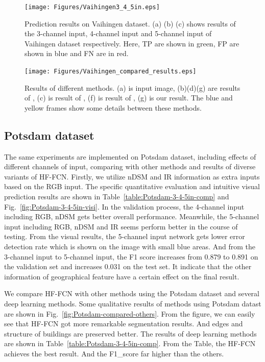 \begin{figure}
\vspace{-0.2cm}
\setlength{\abovecaptionskip}{-0cm}
\setlength{\belowcaptionskip}{-1cm}  
\centering
\texttt{[image: Figures/Vaihingen3\_4\_5in.eps]}
\caption{Prediction results on Vaihingen dataset. (a) (b) (c) shows results of the 3-channel input, 4-channel input and 5-channel input of Vaihingen dataset respectively. Here, TP are shown in green, FP are shown in blue and FN are in red.}
\label{fig:Vaihingen-3-4-5in}
\end{figure}

\begin{figure}
\vspace{-0.2cm}
\setlength{\abovecaptionskip}{-0cm}
\setlength{\belowcaptionskip}{-2cm}  
\centering
\texttt{[image: Figures/Vaihingen\_compared\_results.eps]}
\caption{Results of different methods. (a) is input image, (b)(d)(g) are results of \cite{IEEEexample:audebert2017deep}, (c) is result of \cite{IEEEexample:marmanis2016semantic}, (f) is result of \cite{IEEEexample:unknown}, (g) is our result. The blue and yellow frames show some details between these methods.}
\label{fig:Vaihingen-compared-others}
\end{figure}

\subsection{Potsdam dataset}
 The same experiments are implemented on Potsdam dataset, including effects of different channels of input, comparing with other methods and results of diverse variants of HF-FCN. Firstly, we utilize nDSM and IR information as extra inputs based on the RGB input. The specific quantitative evaluation and intuitive visual prediction results are shown in Table~\ref{table:Potsdam-3-4-5in-comp} and Fig.~\ref{fig:Potsdam-3-4-5in-visi}. In the validation process, the 4-channel input including RGB, nDSM gets better overall performance. Meanwhile, the 5-channel input including RGB, nDSM and IR seems perform better in the course of testing. From the visual results, the 5-channel input network gets lower error detection rate which is shown on the image with small blue areas. And from the 3-channel input to 5-channel input, the F1 score increases from 0.879 to 0.891 on the validation set and increases 0.031 on the test set. It indicate that the other information of geographical feature have a certain effect on the final result.

 We compare HF-FCN with other methods using the Potsdam dataset and several deep learning methods. Some qualitative results of methods using Potsdam datast are shown in Fig.~\ref{fig:Potsdam-compared-others}.
 From the figure, we can easily see that HF-FCN got more remarkable segmentation results. And edges and structure of buildings are preserved better. The results of deep learning methods are shown in Table~\ref{table:Potsdam-3-4-5in-comp}. From the Table, the HF-FCN achieves the best result. And the F1\_score far higher than the others.  

